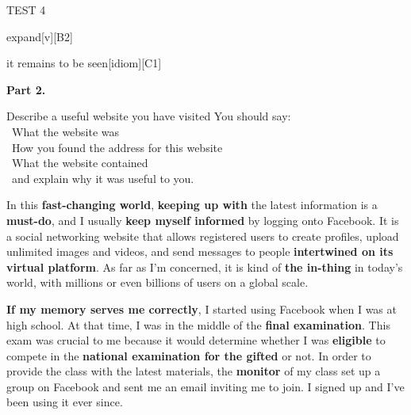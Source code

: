 \begin{glossarymc}[Cambridge 4]
\begin{test}{TEST 4}
\begin{VocabExplain}[Part 1]
			\begin{ExplainCard}{expand}[v][B2]
			\end{ExplainCard}

			\begin{ExplainCard}{it remains to be seen}[idiom][C1]
			\end{ExplainCard}
        \end{VocabExplain}

    \noindent
    \textbf{Part 2.}
	\begin{qa}{Describe a useful website you have visited}
		You should say:\\
		\textbullet\ What the website was\\
		\textbullet\ How you found the address for this website\\
		\textbullet\ What the website contained\\
		\textbullet\ and explain why it was useful to you.

		In this \textbf{fast-changing world}, \textbf{keeping up with} the latest information is a \textbf{must-do}, and I usually \textbf{keep myself informed} by logging onto Facebook. It is a social networking website that allows registered users to create profiles, upload unlimited images and videos, and send messages to people \textbf{intertwined on its virtual platform}. As far as I’m concerned, it is kind of \textbf{the in-thing} in today’s world, with millions or even billions of users on a global scale.

		\textbf{If my memory serves me correctly}, I started using Facebook when I was at high school. At that time, I was in the middle of the \textbf{final examination}. This exam was crucial to me because it would determine whether I was \textbf{eligible} to compete in the \textbf{national examination for the gifted} or not. In order to provide the class with the latest materials, the \textbf{monitor} of my class set up a group on Facebook and sent me an email inviting me to join. I signed up and I’ve been using it ever since.


\end{qa}
\end{test}
\end{glossarymc}
